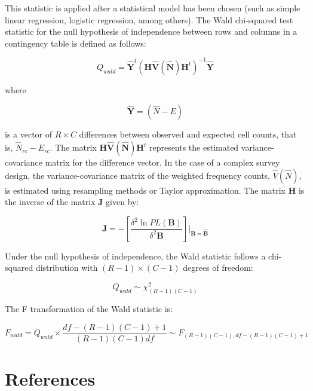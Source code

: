 \documentclass[
  12pt,
]{book}
\begin{document}
This statistic is applied after a statistical model has been chosen (such as simple linear regression, logistic regression, among others). The Wald chi-squared test statistic for the null hypothesis of independence between rows and columns in a contingency table is defined as follows:

\[
Q_{wald} = \hat{\boldsymbol{Y}}^{t} \left(\boldsymbol{H} \hat{\boldsymbol{V}} \left(\hat{\boldsymbol{N}}\right) \boldsymbol{H}^{t}\right)^{-1} \hat{\boldsymbol{Y}}
\]

where

\[
\hat{\boldsymbol{Y}} = \left(\hat{N} - E\right)
\]

is a vector of \(R \times C\) differences between observed and expected cell counts, that is, \(\hat{N}_{rc} - E_{rc}\). The matrix \(\boldsymbol{H} \hat{\boldsymbol{V}} \left(\hat{\boldsymbol{N}}\right) \boldsymbol{H}^{t}\) represents the estimated variance-covariance matrix for the difference vector. In the case of a complex survey design, the variance-covariance matrix of the weighted frequency counts, \(\hat{V} \left(\hat{N}\right)\), is estimated using resampling methods or Taylor approximation. The matrix \(\boldsymbol{H}\) is the inverse of the matrix \(\boldsymbol{J}\) given by:

\[
\boldsymbol{J} = -\left[\frac{\delta^{2} \ln PL\left(\boldsymbol{B}\right)}{\delta^{2} \boldsymbol{B}}\right] \bigg|_{\boldsymbol{B} = \hat{\boldsymbol{B}}}
\]

Under the null hypothesis of independence, the Wald statistic follows a chi-squared distribution with \((R-1) \times (C-1)\) degrees of freedom:

\[
Q_{wald} \sim \chi^{2}_{(R-1)(C-1)}
\]

The F transformation of the Wald statistic is:

\[
F_{wald} = Q_{wald} \times \frac{df - (R-1)(C-1) + 1}{(R-1)(C-1) df} \sim F_{(R-1)(C-1), df - (R-1)(C-1) + 1}
\]

\chapter*{References}\label{references}

  
\end{document}
